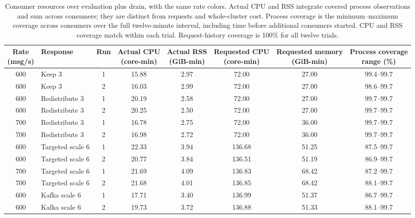 \begin{table}[!htbp]
\centering\footnotesize
\setlength{\tabcolsep}{2pt}
\renewcommand{\arraystretch}{1.12}
\begin{tabular}{@{}clcccccc@{}}
\toprule
\rowcolor[HTML]{DDE3EA}
\shortstack{Rate\\(msg/s)} & Response & Run & \shortstack{Actual CPU\\(core-min)} & \shortstack{Actual RSS\\(GiB-min)} & \shortstack{Requested CPU\\(core-min)} & \shortstack{Requested memory\\(GiB-min)} & \shortstack{Process coverage\\range (\%)}\\
\midrule
\rowcolor[HTML]{FFE1AD}
600 & Keep 3 & 1 & 15.88 & 2.97 & 72.00 & 27.00 & 99.4--99.7\\
\rowcolor[HTML]{FFE1AD}
600 & Keep 3 & 2 & 16.03 & 2.99 & 72.00 & 27.00 & 98.6--99.7\\
\rowcolor[HTML]{FFE1AD}
600 & Redistribute 3 & 1 & 20.19 & 2.58 & 72.00 & 27.00 & 99.7--99.7\\
\rowcolor[HTML]{FFE1AD}
600 & Redistribute 3 & 2 & 20.25 & 2.50 & 72.00 & 27.00 & 99.7--99.7\\
\rowcolor[HTML]{CFE2F3}
700 & Redistribute 3 & 1 & 16.78 & 2.75 & 72.00 & 36.00 & 99.7--99.7\\
\rowcolor[HTML]{CFE2F3}
700 & Redistribute 3 & 2 & 16.98 & 2.72 & 72.00 & 36.00 & 99.7--99.7\\
\rowcolor[HTML]{FFE1AD}
600 & Targeted scale 6 & 1 & 22.33 & 3.94 & 136.68 & 51.25 & 87.5--99.7\\
\rowcolor[HTML]{FFE1AD}
600 & Targeted scale 6 & 2 & 20.77 & 3.84 & 136.51 & 51.19 & 86.9--99.7\\
\rowcolor[HTML]{CFE2F3}
700 & Targeted scale 6 & 1 & 21.69 & 4.09 & 136.83 & 68.42 & 87.2--99.7\\
\rowcolor[HTML]{CFE2F3}
700 & Targeted scale 6 & 2 & 21.68 & 4.01 & 136.85 & 68.42 & 88.1--99.7\\
\rowcolor[HTML]{FFE1AD}
600 & Kafka scale 6 & 1 & 17.71 & 3.40 & 136.99 & 51.37 & 86.7--99.7\\
\rowcolor[HTML]{FFE1AD}
600 & Kafka scale 6 & 2 & 19.73 & 3.72 & 136.88 & 51.33 & 88.1--99.7\\
\bottomrule
\end{tabular}
\caption{Consumer resources over evaluation plus drain, with the same rate colors. Actual CPU and RSS integrate covered process observations and sum across consumers; they are distinct from requests and whole-cluster cost. Process coverage is the minimum--maximum coverage across consumers over the full twelve-minute interval, including time before additional consumers started. CPU and RSS coverage match within each trial. Request-history coverage is 100\% for all twelve trials.}
\label{tab:four-partition-resources}
\end{table}

